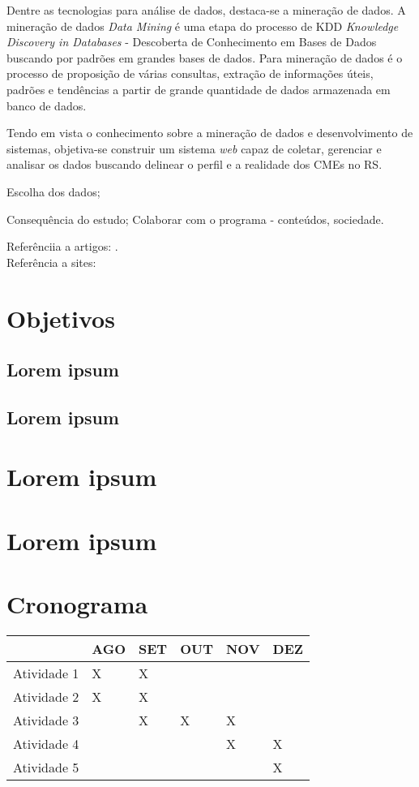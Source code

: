 \documentclass[projtg]{mdtufsm}
\begin{document}
Dentre as tecnologias para análise de dados, destaca-se a mineração de dados. A mineração de dados {\it Data Mining} é uma etapa do processo de KDD {\it Knowledge Discovery in Databases} - Descoberta de Conhecimento em Bases de Dados buscando por padrões em grandes bases de dados. Para \cite{Thuraisingham99} mineração de dados é o processo de proposição de várias consultas, extração de informações úteis, padrões e tendências a partir de grande quantidade de dados armazenada em banco de dados. 

Tendo em vista o conhecimento sobre a mineração de dados e desenvolvimento de sistemas, objetiva-se construir um sistema {\it web} capaz de  coletar, gerenciar e analisar os dados buscando delinear o perfil e a realidade dos CMEs no RS. 


Escolha dos dados; 

Consequência do estudo; Colaborar com o programa - conteúdos, sociedade. 

Referênciia a artigos: . \\
Referência a sites: \cite{siteref2013}

\chapter{Objetivos}
\lipsum[1]

\section{Lorem ipsum}
\lipsum[1]
	
\section{Lorem ipsum}
\lipsum[1]

\chapter{Lorem ipsum}
\lipsum[1]

\chapter{Lorem ipsum}
\lipsum[1]
    
\chapter{Cronograma}
\begin{tabu} to 0.9\linewidth{|X[6]|X|X|X|X|X|}
	\hline
	& AGO & SET & OUT & NOV & DEZ \\
	\hline
	Atividade 1 & X & X & & & \\
	\hline
	Atividade 2 & X & X & & & \\
	\hline
	Atividade 3 & & X & X & X & \\
	\hline
	Atividade 4 & & & & X & X \\
	\hline
	Atividade 5 & & & & & X \\
	\hline
\end{tabu}
 
\setlength{\baselineskip}{\baselineskip}



\end{document}
